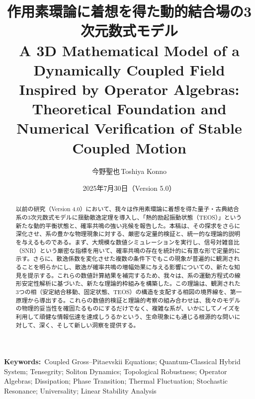 \documentclass[a4paper,11pt,ja=standard,lualatex]{bxjsarticle}
\title{作用素環論に着想を得た動的結合場の3次元数式モデル\\
\large A 3D Mathematical Model of a Dynamically Coupled Field Inspired by Operator Algebras: Theoretical Foundation and Numerical Verification of Stable Coupled Motion}
\author[1]{今野聖也\,Toshiya Konno}
\affil[1]{Independent Researcher\\\href{mailto:ktlifeisonlyreallyoverafter60@gmail.com}{ktlifeisonlyreallyoverafter60@gmail.com}}
\date{2025年7月30日（Version 5.0）}
\begin{document}
\maketitle

\noindent\textbf{Keywords:}\ Coupled Gross–Pitaevskii Equations; Quantum-Classical Hybrid System; Tensegrity; Soliton Dynamics; Topological Robustness; Operator Algebras; Dissipation; Phase Transition; Thermal Fluctuation; Stochastic Resonance; Universality; Linear Stability Analysis

\begin{abstract}
\noindent 以前の研究（Version 4.0）において、我々は作用素環論に着想を得た量子・古典結合系の3次元数式モデルに揺動散逸定理を導入し、「熱的励起振動状態（TEOS）」という新たな動的平衡状態と、確率共鳴の強い兆候を報告した。本稿は、その探求をさらに深化させ、系の豊かな物理現象に対する、厳密な定量的検証と、統一的な理論的説明を与えるものである。まず、大規模な数値シミュレーションを実行し、信号対雑音比（SNR）という厳密な指標を用いて、確率共鳴の存在を統計的に有意な形で定量的に示す。さらに、散逸係数を変化させた複数の条件下でもこの現象が普遍的に観測されることを明らかにし、散逸が確率共鳴の増幅効果に与える影響についての、新たな知見を提示する。これらの数値計算結果を補完するため、我々は、系の運動方程式の線形安定性解析に基づいた、新たな理論的枠組みを構築した。この理論は、観測された3つの相（安定結合移動、固定状態、TEOS）の構造を支配する相図の境界線を、第一原理から導出する。これらの数値的検証と理論的考察の組み合わせは、我々のモデルの物理的妥当性を確固たるものにするだけでなく、複雑な系が、いかにしてノイズを利用して頑健な情報伝達を達成しうるかという、生命現象にも通じる根源的な問いに対して、深く、そして新しい洞察を提供する。
\end{abstract}
\end{document}
